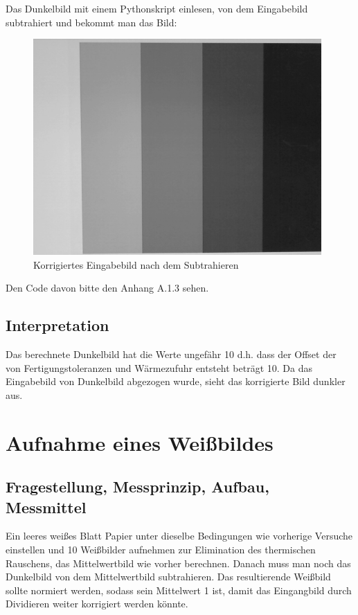 \documentclass[12pt, oneside, a4paper, \docLanguage]{report}
\begin{document}
Das Dunkelbild mit einem Pythonskript einlesen, von dem Eingabebild subtrahiert und bekommt man das Bild:
\begin{figure}[H]
	\centering\small
	\includegraphics[width=11cm]{korrigiertesBildv2.png}
	\caption{Korrigiertes Eingabebild nach dem Subtrahieren}
\end{figure}

Den Code davon bitte den Anhang A.1.3 sehen.
\section{Interpretation}
\label{chap:VERSUCH_2_INTERPRETATION}
Das berechnete Dunkelbild hat die Werte ungefähr 10 d.h. dass der Offset der von Fertigungstoleranzen und Wärmezufuhr entsteht beträgt 10. Da das Eingabebild von Dunkelbild abgezogen wurde, sieht das korrigierte Bild dunkler aus.
%
%
\chapter{Aufnahme eines Weißbildes}


\section{Fragestellung, Messprinzip, Aufbau, Messmittel}
Ein leeres weißes Blatt Papier unter dieselbe Bedingungen wie vorherige Versuche einstellen und 10 Weißbilder aufnehmen zur Elimination des thermischen Rauschens,
das Mittelwertbild wie vorher berechnen. Danach muss man noch das Dunkelbild von dem Mittelwertbild subtrahieren.
Das resultierende Weißbild sollte normiert werden, sodass sein Mittelwert 1 ist, damit das Eingangbild durch Dividieren weiter korrigiert werden könnte. 
\end{document}
